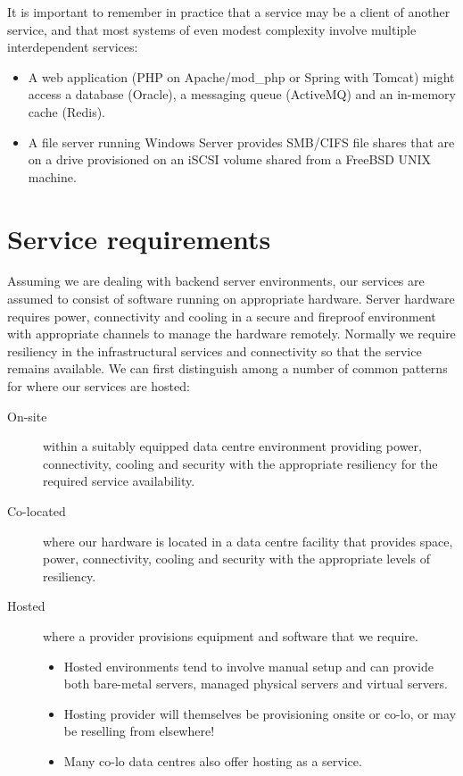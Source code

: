 \documentclass{pgnotes}
\begin{document}
It is important to remember in practice that a service may be a client of another service, and that most systems of even modest complexity involve multiple interdependent services:
\begin{itemize}
\item A web application (PHP on Apache/mod\_php or Spring with Tomcat) might access a database (Oracle), a messaging queue (ActiveMQ) and an in-memory cache (Redis).
\item A file server running Windows Server provides SMB/CIFS file shares that are on a drive provisioned on an iSCSI volume shared from a FreeBSD UNIX machine. 
\end{itemize}

\section{Service requirements}
\label{sec:service-models}

Assuming we are dealing with backend server environments, our services are assumed to consist of software running on appropriate hardware.
Server hardware requires power, connectivity and cooling in a secure and fireproof environment with appropriate channels to manage the hardware remotely.
Normally we require resiliency in the infrastructural services and connectivity so that the service remains available.
We can first distinguish among a number of common patterns for where our services are hosted: 
\begin{description}
\item[On-site] within a suitably equipped data centre environment providing power, connectivity, cooling and security with the appropriate resiliency for the required service availability.
\item[Co-located] where our hardware is located in a data centre facility that provides space, power, connectivity, cooling and security with the appropriate levels of resiliency.
\item[Hosted] where a provider provisions equipment and software that we require.
  \begin{itemize}
  \item Hosted environments tend to involve manual setup and can provide both bare-metal servers, managed physical servers and virtual servers.
  \item Hosting provider will themselves be provisioning onsite or co-lo, or may be reselling from elsewhere!
  \item Many co-lo data centres also offer hosting as a service. 
  \end{itemize}
\end{description}
\end{document}
